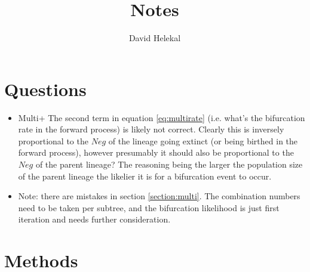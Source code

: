 \documentclass{report}
\title{Notes}
\author{David Helekal}
\theoremstyle{definition}
\begin{document}
\maketitle
\newpage
\tableofcontents
\newpage
\chapter{Questions}
\begin{itemize}
  \item Multi+ The second term in equation \ref{eq:multirate} (i.e. what's the bifurcation rate in the forward process) is likely not correct. Clearly this is inversely proportional to the $Neg$ of the lineage going extinct (or being birthed in the forward process), however presumably it should also be proportional to the $Neg$ of the parent lineage? The reasoning being the larger the population size of the parent lineage the likelier it is for a bifurcation event to occur.
  \item Note: there are mistakes in section \ref{section:multi}. The combination numbers need to be taken per subtree, and the bifurcation likelihood is just first iteration and needs further consideration.
\end{itemize}
\chapter{Methods}
\end{document}
